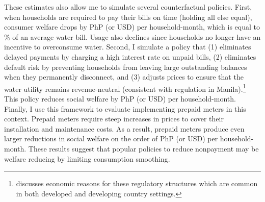 \documentclass[12pt]{article}
\begin{document}
These estimates also allow me to simulate several counterfactual policies.  First, when households are required to pay their bills on time (holding all else equal), consumer welfare drops by PhP (or USD) per household-month, which is equal to \unskip\% of an average water bill.  Usage also declines since households no longer have an incentive to overconsume water.  Second, I simulate a policy that (1) eliminates delayed payments by charging a high interest rate on unpaid bills, (2) eliminates default risk by preventing households from leaving large outstanding balances when they permanently disconnect, and (3) adjusts prices to ensure that the water utility remains revenue-neutral (consistent with regulation in Manila).\footnote{\cite{laffont2005regulation} discusses economic reasons for these regulatory structures which are common in both developed and developing country settings.}  This policy reduces social welfare by PhP (or USD) per household-month.  Finally, I use this framework to evaluate implementing prepaid meters in this context.  Prepaid meters require steep increases in prices to cover their installation and maintenance costs.  As a result, prepaid meters produce even larger reductions in social welfare on the order of PhP (or USD) per household-month.  These results suggest that popular policies to reduce nonpayment may be welfare reducing by limiting consumption smoothing.


\end{document}
